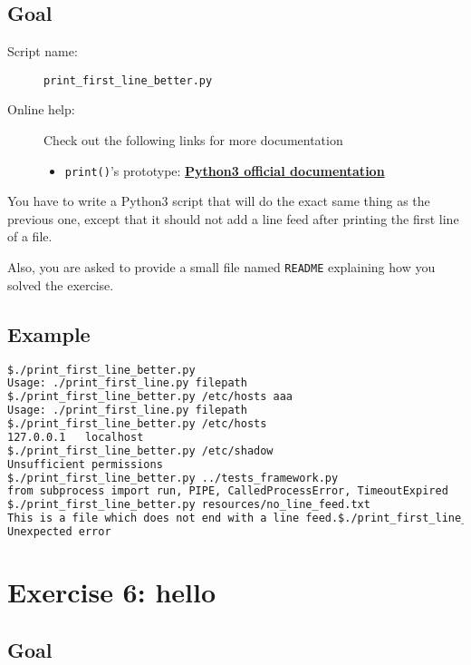 \documentclass[12pt]{article}
\let\oldhref\href
\renewcommand{\href}[2]{\oldhref{#1}{\bfseries#2}}
\begin{document}
\subsection{Goal}

\begin{description}
        \item[Script name:] \texttt{print\_first\_line\_better.py}
        \item[Online help:] Check out the following links for more documentation
	\begin{itemize}
		\item \texttt{print()}'s prototype: \href{https://docs.python.org/3/library/functions.html\#print}{Python3 official documentation}
	\end{itemize}
\end{description}

You have to write a Python3 script that will do the exact same thing as the previous one, except that it should not add a line feed after printing the first line of a file.

Also, you are asked to provide a small file named \texttt{README} explaining how you solved the exercise.

\subsection{Example}

\begin{lstlisting}[language=bash]
$./print_first_line_better.py 
Usage: ./print_first_line.py filepath
$./print_first_line_better.py /etc/hosts aaa
Usage: ./print_first_line.py filepath
$./print_first_line_better.py /etc/hosts
127.0.0.1	localhost
$./print_first_line_better.py /etc/shadow
Unsufficient permissions
$./print_first_line_better.py ../tests_framework.py 
from subprocess import run, PIPE, CalledProcessError, TimeoutExpired
$./print_first_line_better.py resources/no_line_feed.txt 
This is a file which does not end with a line feed.$./print_first_line_better.py resources/ #Notice the difference?
Unexpected error
\end{lstlisting}

\section{Exercise 6: hello}
\subsection{Goal}
\end{document}
